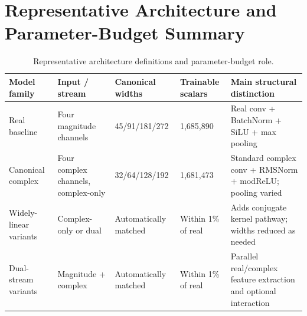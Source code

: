 \section{Representative Architecture and Parameter-Budget Summary}

\begin{table}[t]
\centering
\caption{Representative architecture definitions and parameter-budget role.}
\label{tab:architectures}
\scriptsize
\begin{tabularx}{\textwidth}{L{2.5cm}L{3.5cm}L{2.7cm}L{2.3cm}X}
\toprule
Model family & Input / stream & Canonical widths & Trainable scalars & Main structural distinction \\
\midrule
Real baseline & Four magnitude channels & 45/91/181/272 & 1,685,890 & Real conv + BatchNorm + SiLU + max pooling \\
Canonical complex & Four complex channels, complex-only & 32/64/128/192 & 1,681,473 & Standard complex conv + RMSNorm + modReLU; pooling varied \\
Widely-linear variants & Complex-only or dual & Automatically matched & Within 1\% of real & Adds conjugate kernel pathway; widths reduced as needed \\
Dual-stream variants & Magnitude + complex & Automatically matched & Within 1\% of real & Parallel real/complex feature extraction and optional interaction \\
\bottomrule
\end{tabularx}
\end{table}

